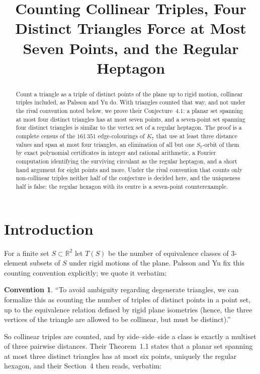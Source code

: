 \documentclass[11pt]{amsart}
\title[Four distinct triangles, collinear triples counted]
{Counting Collinear Triples, Four Distinct Triangles Force at Most Seven
Points, and the Regular Heptagon}
\date{}
\numberwithin{theorem}{section}
\theoremstyle{remark}
\theoremstyle{definition}
\newtheorem*{convention}{Convention}
\newcommand{\Tcount}{T}
\begin{document}
\begin{abstract}
Count a triangle as a triple of distinct points of the plane up to rigid motion,
collinear triples included, as Palsson and Yu do. With triangles counted that
way, and not under the rival convention noted below, we prove their
Conjecture~4.1: a planar set spanning at most four distinct triangles has at
most seven points, and a seven-point set spanning four distinct triangles is
similar to the vertex set of a regular heptagon. The proof
is a complete census of the $161\,351$ edge-colourings of $K_7$ that use at
least three distance values and span at most four triangles, an elimination of
all but one $S_7$-orbit of them by exact polynomial certificates in integer and
rational arithmetic, a Fourier computation identifying the surviving circulant
as the regular heptagon, and a short hand argument for eight points and more.
Under the rival convention that counts only non-collinear triples neither half
of the conjecture is decided here, and the uniqueness half is false: the regular
hexagon with its centre is a seven-point counterexample.
\end{abstract}

\maketitle

\section{Introduction}

For a finite set $S\subset\mathbb R^2$ let $\Tcount(S)$ be the number of
equivalence classes of $3$-element subsets of $S$ under rigid motions of the
plane. Palsson and Yu \cite{PY} fix this counting convention explicitly; we
quote it verbatim:

\begin{convention}
``To avoid ambiguity regarding degenerate triangles, we can formalize this as
counting the number of triples of distinct points in a point set, up to the
equivalence relation defined by rigid plane isometries (hence, the three
vertices of the triangle are allowed to be collinear, but must be distinct).''
\end{convention}

\noindent
So collinear triples are counted, and by side--side--side a class is exactly a
multiset of three pairwise distances. Their Theorem~1.1 states that a planar set
spanning at most three distinct triangles has at most six points, uniquely the
regular hexagon, and their Section~4 then reads, verbatim:
\end{document}
